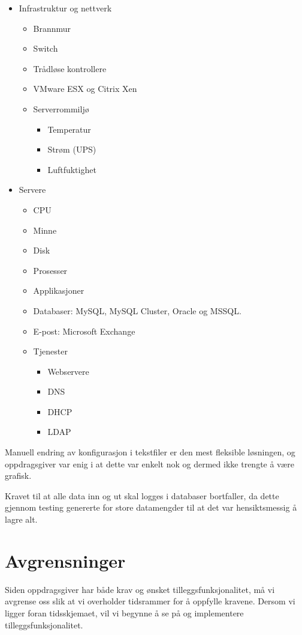 \begin{itemize}
	\item Infrastruktur og nettverk
	\begin{itemize}
		\item Brannmur
		\item Switch
		\item Trådløse kontrollere
		\item VMware ESX og Citrix Xen
		\item Serverrommiljø
		\begin{itemize}
			\item Temperatur
			\item Strøm (UPS)
			\item Luftfuktighet
		\end{itemize}
	\end{itemize}
	\item Servere
	\begin{itemize}
		\item CPU
		\item Minne
		\item Disk
		\item Prosesser
		\item Applikasjoner
		\item Databaser: MySQL, MySQL Cluster, Oracle og MSSQL.
		\item E-post: Microsoft Exchange
		\item Tjenester
		\begin{itemize}
			\item Webservere
			\item DNS 
			\item DHCP
			\item LDAP
		\end{itemize}
	\end{itemize}
\end{itemize}

Manuell endring av konfigurasjon i tekstfiler er den mest fleksible løsningen, og oppdragsgiver var enig i at dette var enkelt nok og dermed ikke trengte å være grafisk.

Kravet til at alle data inn og ut skal logges i databaser bortfaller, da dette gjennom testing genererte for store datamengder til at det var hensiktsmessig å lagre alt.

\section{Avgrensninger}
Siden oppdragsgiver har både krav og ønsket tilleggsfunksjonalitet, må vi avgrense oss slik at vi overholder tidsrammer for å oppfylle kravene. Dersom vi ligger foran tidsskjemaet, vil vi begynne å se på og implementere tilleggsfunksjonalitet.

